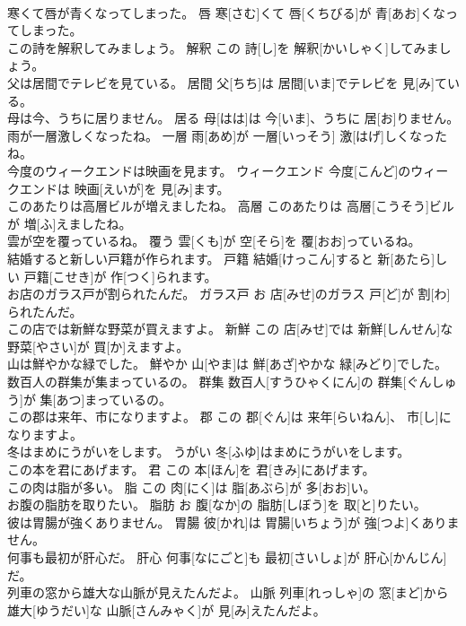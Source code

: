 \documentclass[8pt]{extreport}
\begin{document}
\begin{CJK}{UTF8}{min}
\\	寒くて唇が青くなってしまった。	唇	寒[さむ]くて 唇[くちびる]が 青[あお]くなってしまった。	
\\	この詩を解釈してみましょう。	解釈	この 詩[し]を 解釈[かいしゃく]してみましょう。	
\\	父は居間でテレビを見ている。	居間	父[ちち]は 居間[いま]でテレビを 見[み]ている。	
\\	母は今、うちに居りません。	居る	母[はは]は 今[いま]、うちに 居[お]りません。	
\\	雨が一層激しくなったね。	一層	雨[あめ]が 一層[いっそう] 激[はげ]しくなったね。	
\\	今度のウィークエンドは映画を見ます。	ウィークエンド	今度[こんど]のウィークエンドは 映画[えいが]を 見[み]ます。	
\\	このあたりは高層ビルが増えましたね。	高層	このあたりは 高層[こうそう]ビルが 増[ふ]えましたね。	
\\	雲が空を覆っているね。	覆う	雲[くも]が 空[そら]を 覆[おお]っているね。	
\\	結婚すると新しい戸籍が作られます。	戸籍	結婚[けっこん]すると 新[あたら]しい 戸籍[こせき]が 作[つく]られます。	
\\	お店のガラス戸が割られたんだ。	ガラス戸	お 店[みせ]のガラス 戸[ど]が 割[わ]られたんだ。	
\\	この店では新鮮な野菜が買えますよ。	新鮮	この 店[みせ]では 新鮮[しんせん]な 野菜[やさい]が 買[か]えますよ。	
\\	山は鮮やかな緑でした。	鮮やか	山[やま]は 鮮[あざ]やかな 緑[みどり]でした。	
\\	数百人の群集が集まっているの。	群集	数百人[すうひゃくにん]の 群集[ぐんしゅう]が 集[あつ]まっているの。	
\\	この郡は来年、市になりますよ。	郡	この 郡[ぐん]は 来年[らいねん]、 市[し]になりますよ。	
\\	冬はまめにうがいをします。	うがい	冬[ふゆ]はまめにうがいをします。	
\\	この本を君にあげます。	君	この 本[ほん]を 君[きみ]にあげます。	
\\	この肉は脂が多い。	脂	この 肉[にく]は 脂[あぶら]が 多[おお]い。	
\\	お腹の脂肪を取りたい。	脂肪	お 腹[なか]の 脂肪[しぼう]を 取[と]りたい。	
\\	彼は胃腸が強くありません。	胃腸	彼[かれ]は 胃腸[いちょう]が 強[つよ]くありません。	
\\	何事も最初が肝心だ。	肝心	何事[なにごと]も 最初[さいしょ]が 肝心[かんじん]だ。	
\\	列車の窓から雄大な山脈が見えたんだよ。	山脈	列車[れっしゃ]の 窓[まど]から 雄大[ゆうだい]な 山脈[さんみゃく]が 見[み]えたんだよ。	

\end{CJK}
\end{document}
